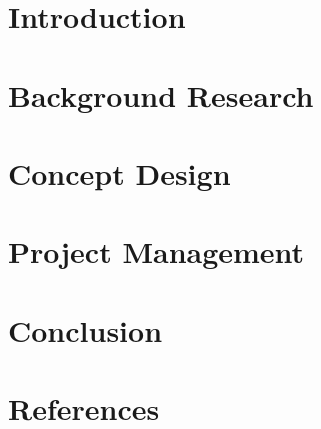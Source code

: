 \documentclass[12pt,oneside,letterpaper,english]{article}
\begin{document}

    \begin{singlespace}
        
    \end{singlespace}

    \newpage
     
    
    \newpage
    \tableofcontents
    \thispagestyle{fancy}
    
    \newpage
    
    \newpage
    \section{Introduction} \label{ch1}
     
    
    \newpage
    \section{Background Research} \label{ch2}
     
    
    \newpage
    \section{Concept Design} \label{ch3}
     
    
    \newpage
    \section{Project Management} \label{ch4}
     
    
    \section{Conclusion} \label{ch5}
    
    
    \newpage
    \section{References} \label{ch6}
    \begingroup
        \renewcommand{\refname}{} %
        \setlength{\parskip}{0pt}
        \setlength{\itemsep}{0pt plus 0.3ex}
        \vspace{-4em}
        \nocite{*}
        \footnotesize{}
        \vspace{-1.5em}
    \endgroup
    
\end{document}
